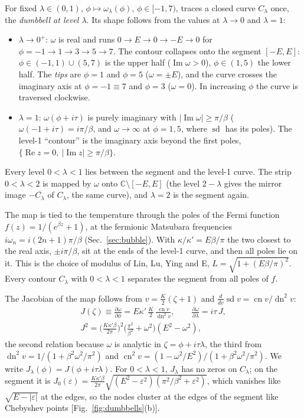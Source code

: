 \documentclass[aps,prb,reprint,a4paper]{revtex4-2}
\renewcommand{\sd}{\operatorname{sd}}%
\newcommand{\cn}{\operatorname{cn}}
\newcommand{\dn}{\operatorname{dn}}
\DeclareMathOperator{\Imag}{Im}
\DeclareMathOperator{\Real}{Re}
\begin{document}
For fixed $\lambda\in(0,1)$, $\phi\mapsto\omega_\lambda(\phi)$, $\phi\in[-1,7)$, traces a closed curve $C_\lambda$ once, the \emph{dumbbell at level $\lambda$}. Its shape follows from the values at $\lambda\to0$ and $\lambda=1$:
\begin{itemize}
  \item $\lambda\to0^+$: $\omega$ is real and runs $0\to E\to0\to-E\to0$ for $\phi=-1\to1\to3\to5\to7$. The contour collapses onto the segment $[-E,E]$: $\phi\in(-1,1)\cup(5,7)$ is the upper half ($\Imag\omega>0$), $\phi\in(1,5)$ the lower half. The \emph{tips} are $\phi=1$ and $\phi=5$ ($\omega=\pm E$), and the curve crosses the imaginary axis at $\phi=-1\equiv7$ and $\phi=3$ ($\omega=0$). In increasing $\phi$ the curve is traversed clockwise.
  \item $\lambda=1$: $\omega(\phi+i\tau)$ is purely imaginary with $\lvert\Imag\omega\rvert\ge\pi/\beta$ ($\omega(-1+i\tau)=i\pi/\beta$, and $\omega\to\infty$ at $\phi=1,5$, where $\sd$ has its poles). The level-1 ``contour'' is the imaginary axis beyond the first poles, $\{\Real z=0,\ \lvert\Imag z\rvert\ge\pi/\beta\}$.
\end{itemize}
Every level $0<\lambda<1$ lies between the segment and the level-1 curve. The strip $0<\lambda<2$ is mapped by $\omega$ onto $\mathbb C\setminus[-E,E]$ (the level $2-\lambda$ gives the mirror image $-\overline{C_\lambda}$ of $C_\lambda$, the same curve), and $\lambda=2$ is the segment again.

The map is tied to the temperature through the poles of the Fermi function $f(z)=1/(e^{\beta z}+1)$, at the fermionic Matsubara frequencies $i\omega_n=i(2n+1)\pi/\beta$ (Sec.~\ref{sec:bubble}). With $\kappa/\kappa'=E\beta/\pi$ the two closest to the real axis, $\pm i\pi/\beta$, sit at the ends of the level-1 curve, and then all poles lie on it. This is the choice of modulus of Lin, Lu, Ying and E, $L=\sqrt{1+(E\beta/\pi)^2}$. Every contour $C_\lambda$ with $0<\lambda<1$ separates the segment from all poles of $f$.

The Jacobian of the map follows from $v=\frac K2(\zeta+1)$ and $\frac{d}{dv}\sd v=\cn v/\dn^2v$:
\begin{equation}
  \begin{gathered}
  J(\zeta)\equiv\frac{\partial\omega}{\partial\phi}=E\kappa'\,\frac K2\,\frac{\cn v}{\dn^2v},\qquad
  \frac{\partial\omega}{\partial\lambda}=i\tau\,J,\\
  J^2=\Big(\frac{K\kappa'\beta}{2\pi}\Big)^2\Big(\frac{\pi^2}{\beta^2}+\omega^2\Big)(E^2-\omega^2),
  \end{gathered}
  \label{eq:jacobian}
\end{equation}
the second relation because $\omega$ is analytic in $\zeta=\phi+i\tau\lambda$, the third from $\dn^2v=1/(1+\beta^2\omega^2/\pi^2)$ and $\cn^2v=(1-\omega^2/E^2)/(1+\beta^2\omega^2/\pi^2)$. We write $J_\lambda(\phi)=J(\phi+i\tau\lambda)$. For $0<\lambda<1$, $J_\lambda$ has no zeros on $C_\lambda$; on the segment it is $J_0(\varepsilon)=\frac{K\kappa'\beta}{2\pi}\sqrt{(E^2-\varepsilon^2)(\pi^2/\beta^2+\varepsilon^2)}$, which vanishes like $\sqrt{E-\lvert\varepsilon\rvert}$ at the edges, so the nodes cluster at the edges of the segment like Chebyshev points [Fig.~\ref{fig:dumbbells}(b)].
\end{document}
